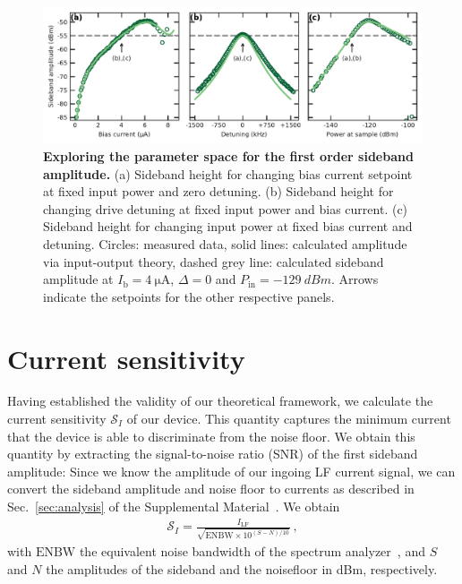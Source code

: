 \begin{figure}[]
	\centering
	\includegraphics[width=\linewidth]{chapter-currentdetection/figures/Figure3}
	\caption{
		\textbf{Exploring the parameter space for the first order sideband amplitude.}
		(a) Sideband height for changing bias current setpoint at fixed input power and zero detuning. %
		(b) Sideband height for changing drive detuning at fixed input power and bias current.
		(c) Sideband height for changing input power at fixed bias current and detuning. %
		Circles: measured data, solid lines: calculated amplitude via input-output theory, dashed grey line: calculated sideband amplitude at $I_\text{b}=\SI{4}{\micro\ampere}$, $\Delta=0$ and $P_\text{in}=\SI{-129}{dBm}$.
		Arrows indicate the setpoints for the other respective panels.
		\label{fig:figure3}
	}
\end{figure}

\section{Current sensitivity}

Having established the validity of our theoretical framework, we calculate the current sensitivity $\mathcal{S}_I$ of our device.
% 
This quantity captures the minimum current that the device is able to discriminate from the noise floor.
% 
We obtain this quantity by extracting the signal-to-noise ratio (SNR) of the first sideband amplitude:
% 
Since we know the amplitude of our ingoing LF current signal, we can convert the sideband amplitude and noise floor to currents as described in Sec.~\ref{sec:analysis} of the Supplemental Material~\cite{SeeSupplementalMaterial}.
% 
We obtain
% 
\begin{align}
\mathcal{S}_I = \frac{I_\text{LF}}{\sqrt{\text{ENBW}\times10^{(S-N)/10}}}\ ,
\label{eq:sensitivity}
\end{align}
% 
with $\text{ENBW}$ the equivalent noise bandwidth of the spectrum analyzer~\cite{rauscherFundamentalsSpectrumAnalysis2016}, and $S$ and $N$ the amplitudes of the sideband and the noisefloor in \si{dBm}, respectively.

